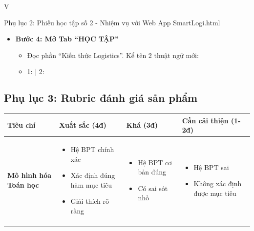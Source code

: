 \begin{competitionsection}{V}
\begin{phieuhoc_tap_box}{Phụ lục 2: Phiếu học tập số 2 - Nhiệm vụ với Web App SmartLogi.html}
\begin{itemize}[leftmargin=*,noitemsep]
\item \textbf{Bước 4: Mở Tab ``HỌC TẬP''}
    \begin{itemize}
    \item Đọc phần ``Kiến thức Logistics''. Kể tên 2 thuật ngữ mới:
    \item 1: \underline{\hspace{4cm}} | 2: \underline{\hspace{4cm}}
    \end{itemize}
\end{itemize}
\end{phieuhoc_tap_box}

\newpage
\subsection*{Phụ lục 3: Rubric đánh giá sản phẩm}
\begin{tabularx}{\linewidth}{@{} >{\raggedright\arraybackslash}p{3.2cm} >{\raggedright\arraybackslash}X >{\raggedright\arraybackslash}X >{\raggedright\arraybackslash}X @{}}
    \toprule
    \rowcolor{TableHeader}
    \sffamily\bfseries Tiêu chí & \sffamily\bfseries Xuất sắc (4đ) & \sffamily\bfseries Khá (3đ) & \sffamily\bfseries Cần cải thiện (1-2đ) \\
    \midrule
    
    \textbf{Mô hình hóa Toán học} 
    & 
    \begin{itemize}[leftmargin=*,noitemsep,topsep=1ex]
        \item Hệ BPT chính xác
        \item Xác định đúng hàm mục tiêu
        \item Giải thích rõ ràng
    \end{itemize}
    & 
    \begin{itemize}[leftmargin=*,noitemsep,topsep=1ex]
        \item Hệ BPT cơ bản đúng
        \item Có sai sót nhỏ
    \end{itemize}
    & 
    \begin{itemize}[leftmargin=*,noitemsep,topsep=1ex]
        \item Hệ BPT sai
        \item Không xác định được mục tiêu
    \end{itemize} \\
    \addlinespace
    

\end{tabularx}
\end{competitionsection}
